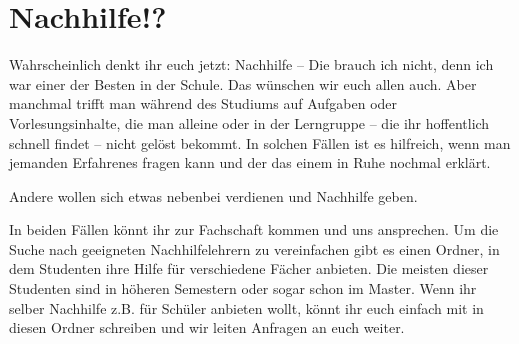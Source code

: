 \section{Nachhilfe!?}

\begin{multicols}{2}

Wahrscheinlich denkt ihr euch jetzt: Nachhilfe -- Die brauch ich nicht, denn ich war einer der Besten in der Schule. Das wünschen wir euch allen auch. Aber manchmal trifft man während des Studiums auf Aufgaben oder Vorlesungsinhalte, die man alleine oder in der Lerngruppe -- die ihr hoffentlich schnell findet -- nicht gelöst bekommt. In solchen Fällen ist es hilfreich, wenn man jemanden Erfahrenes fragen kann und der das einem in Ruhe nochmal erklärt.

Andere wollen sich etwas nebenbei verdienen und Nachhilfe geben.

In beiden Fällen könnt ihr zur Fachschaft kommen und uns ansprechen. Um die Suche nach geeigneten Nachhilfelehrern zu vereinfachen gibt es einen Ordner, in dem Studenten ihre Hilfe für verschiedene Fächer anbieten. Die meisten dieser Studenten sind in höheren Semestern oder sogar schon im Master. Wenn ihr selber Nachhilfe z.B. für Schüler anbieten wollt, könnt ihr euch einfach mit in diesen Ordner schreiben und wir leiten Anfragen an euch weiter. 

\end{multicols}
